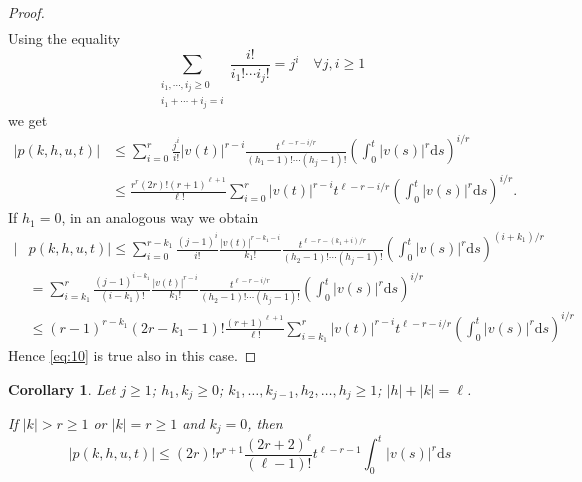 \documentclass{article}
\newtheorem{corollary}{Corollary}[section]
\newcommand{\dd}{\mathrm{d}}
\begin{document}
\begin{proof}
\begin{equation*}
\begin{split}
		\end{split}
	\end{equation*}
	Using the equality
	\begin{equation}
		\label{eq:12}
		\sum_{\substack{i_1,\dotsb,i_j\geq0\\i_1+\dotsb+i_j=i}} \frac{i!}{i_1! \dotsb i_j!} = j^i
		\quad \forall j, i \geq 1
	\end{equation}
	we get
	\begin{equation*}
		\begin{split}
			|p(k,h,u,t)| 
			& \leq \sum_{i=0}^r \frac{j^i}{i!} |v(t)|^{r-i} \frac{t^{\ell-r-i/r}}{(h_1-1)! \dotsb (h_j-1)!} \left(\int_0^t |v(s)|^r \dd s\right)^{i/r} \\
			& \leq \frac{r^r (2r)! (r+1)^{\ell+1}}{\ell!} \sum_{i=0}^r |v(t)|^{r-i} t^{\ell-r-i/r} \left(\int_0^t |v(s)|^r \dd s\right)^{i/r}.
		\end{split}
	\end{equation*}
	If $h_1 = 0$, in an analogous way we obtain
	\begin{equation*}
		\begin{split}
			|&p(k,h,u,t)| 
			\leq \sum_{i=0}^{r-k_1} \frac{(j-1)^i}{i!} \frac{|v(t)|^{r-k_1-i}}{k_1!} \frac{t^{\ell-r-(k_1+i)/r}}{(h_2-1)! \dotsb (h_j-1)!} \left(\int_0^t |v(s)|^r \dd s\right)^{(i+k_1)/r} \\
			& = \sum_{i=k_1}^{r} \frac{(j-1)^{i-k_1}}{(i-k_1)!} \frac{|v(t)|^{r-i}}{k_1!} \frac{t^{\ell-r-i/r}}{(h_2-1)! \dotsb (h_j-1)!} \left(\int_0^t |v(s)|^r \dd s\right)^{i/r} \\
			& \leq(r-1)^{r-k_1}\left(2 r-k_1-1\right) ! \frac{(r+1)^{\ell+1}}{\ell !} \sum_{i=k_1}^r|v(t)|^{r-i} t^{\ell-r-i / r}\left(\int_0^t|v(s)|^r \dd s\right)^{i / r}
		\end{split}
	\end{equation*}
	Hence \eqref{eq:10} is true also in this case.
\end{proof}

\begin{corollary}
	Let $j \geq 1$; $h_1, k_j \geq 0$; $k_1, \ldots, k_{j-1}, h_2, \ldots, h_j \geq 1$; $|h|+|k|=\ell$.
	
	If $|k|>r \geq 1$ or $|k|=r \geq 1$ and $k_j=0$, then
	\begin{equation}
		\label{eq:13}
		|p(k, h, u, t)| \leq (2 r) ! r^{r+1} \frac{(2 r+2)^\ell}{(\ell-1) !} t^{\ell-r-1} \int_0^t|v(s)|^r \dd s
	\end{equation}
\end{corollary}
\end{document}
